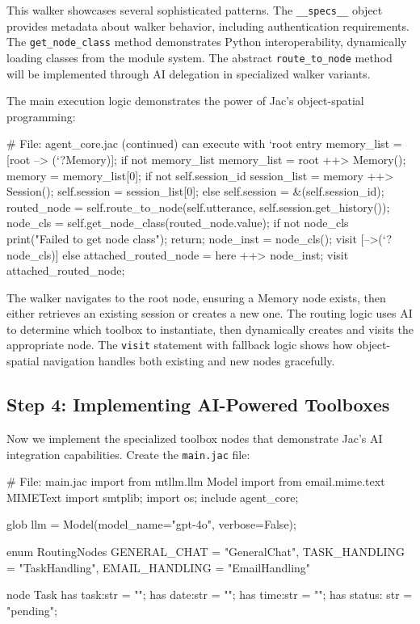 This walker showcases several sophisticated patterns. The \texttt{\_\_specs\_\_} object provides metadata about walker behavior, including authentication requirements. The \texttt{get\_node\_class} method demonstrates Python interoperability, dynamically loading classes from the module system. The abstract \texttt{route\_to\_node} method will be implemented through AI delegation in specialized walker variants.

The main execution logic demonstrates the power of Jac's object-spatial programming:

\begin{jacblock}
# File: agent_core.jac (continued)
    can execute with `root entry {
        memory_list = [root --> (`?Memory)];
        if not memory_list {
            memory_list = root ++> Memory();
        }
        memory = memory_list[0];
        if not self.session_id {
            session_list = memory ++> Session();
            self.session = session_list[0];
        } else {
            self.session = &(self.session_id);
        }
        routed_node = self.route_to_node(self.utterance, self.session.get_history());
        node_cls = self.get_node_class(routed_node.value);
        if not node_cls {
            print("Failed to get node class");
            return;
        }
        node_inst = node_cls();
        visit [-->(`?node_cls)] else {
            attached_routed_node = here ++> node_inst;
            visit attached_routed_node;
        }
    }
\end{jacblock}

The walker navigates to the root node, ensuring a Memory node exists, then either retrieves an existing session or creates a new one. The routing logic uses AI to determine which toolbox to instantiate, then dynamically creates and visits the appropriate node. The \texttt{visit} statement with fallback logic shows how object-spatial navigation handles both existing and new nodes gracefully.

\subsection{Step 4: Implementing AI-Powered Toolboxes}

Now we implement the specialized toolbox nodes that demonstrate Jac's AI integration capabilities. Create the \texttt{main.jac} file:

\begin{jacblock}
# File: main.jac
import from mtllm.llm { Model }
import from email.mime.text { MIMEText }
import smtplib;
import os;
include agent_core;

glob llm = Model(model_name="gpt-4o", verbose=False);

enum RoutingNodes {
    GENERAL_CHAT = "GeneralChat",
    TASK_HANDLING = "TaskHandling",
    EMAIL_HANDLING = "EmailHandling"
}

node Task {
    has task:str = "";
    has date:str = "";
    has time:str = "";
    has status: str = "pending";
}
\end{jacblock}

